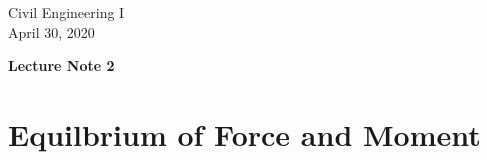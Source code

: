 \documentclass[10pt,a4j]{article}
\newlength{\minitwocolumn}
\begin{document}
\newcommand{\fat}[1]{\mbox{\boldmath $#1$}}
\newcommand{\D}{\partial}
\newcommand{\w}{\omega}
\newcommand{\ga}{\alpha}
\newcommand{\gb}{\beta}
\newcommand{\gx}{\xi}
\newcommand{\gz}{\zeta}
\newcommand{\vhat}[1]{\hat{\fat{#1}}}
\newcommand{\spc}{\vspace{0.7\baselineskip}}
\newcommand{\halfspc}{\vspace{0.3\baselineskip}}

\newcommand{\twofig}[2]
 {
   \begin{figure}
     \begin{minipage}[t]{\minitwocolumn}
         \begin{center}   #1
         \end{center}
     \end{minipage}
         \hspace{\columnsep}
     \begin{minipage}[t]{\minitwocolumn}
         \begin{center} #2
         \end{center}
     \end{minipage}
   \end{figure}
 }
\begin{flushright}
	Civil Engineering I\\
	April 30, 2020
\end{flushright}
\begin{center}
	{\LARGE \bf Lecture Note 2}
\end{center}
\setcounter{section}{1}
\section{Equilbrium of Force and Moment}
\end{document}

